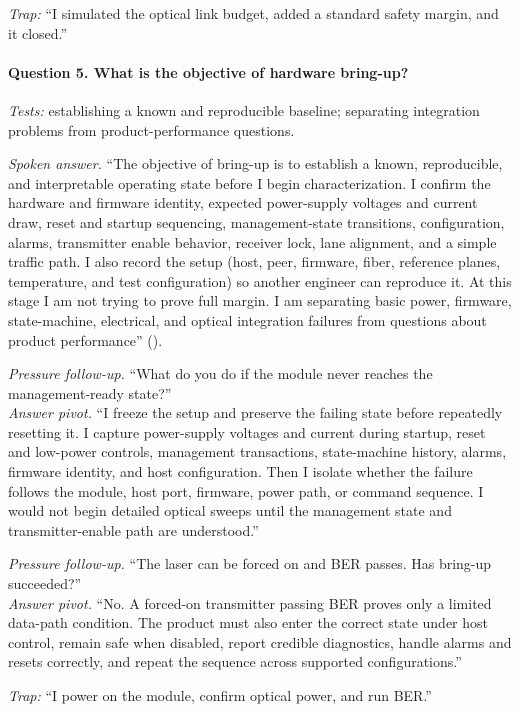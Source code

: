 \textit{Trap:} ``I simulated the optical link budget, added a standard safety
margin, and it closed.''

\paragraph{Question 5. What is the objective of hardware bring-up?}
\textit{Tests:} establishing a known and reproducible baseline; separating
integration problems from product-performance questions.

\textit{Spoken answer.}
``The objective of bring-up is to establish a known, reproducible, and
interpretable operating state before I begin characterization. I confirm the
hardware and firmware identity, expected power-supply voltages and current draw,
reset and startup sequencing, management-state transitions, configuration,
alarms, transmitter enable behavior, receiver lock, lane alignment, and a
simple traffic path. I also record the setup (host, peer, firmware, fiber, reference planes,
temperature, and test configuration) so another engineer can reproduce it. At this stage I am not trying to prove full margin. I am
separating basic power, firmware, state-machine, electrical, and optical
integration failures from questions about product performance''
().

\textit{Pressure follow-up.} ``What do you do if the module never reaches the
management-ready state?''\\
\textit{Answer pivot.} ``I freeze the setup and preserve the failing state
before repeatedly resetting it. I capture power-supply voltages and current
during startup, reset and low-power controls, management transactions,
state-machine history, alarms, firmware identity, and host configuration. Then
I isolate whether the failure follows the module, host port, firmware, power
path, or command sequence. I would not begin detailed optical sweeps until the
management state and transmitter-enable path are understood.''

\textit{Pressure follow-up.} ``The laser can be forced on and BER passes. Has
bring-up succeeded?''\\
\textit{Answer pivot.} ``No. A forced-on transmitter passing BER proves only a
limited data-path condition. The product must also enter the correct state
under host control, remain safe when disabled, report credible diagnostics,
handle alarms and resets correctly, and repeat the sequence across supported
configurations.''

\textit{Trap:} ``I power on the module, confirm optical power, and run BER.''

